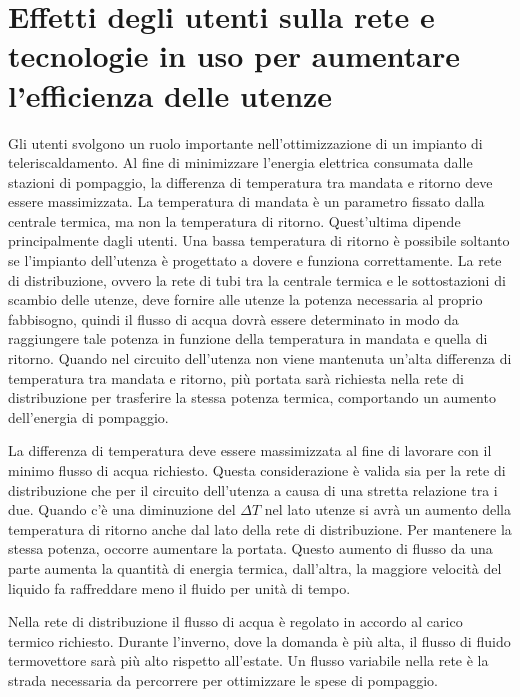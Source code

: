 \documentclass[laurea,oneside,11pt]{USiena_tesiLM}
\begin{document}
\section{Effetti degli utenti sulla rete e tecnologie in uso per aumentare l'efficienza delle utenze}
Gli utenti svolgono un ruolo importante nell'ottimizzazione di un impianto di teleriscaldamento. Al fine di minimizzare l'energia elettrica consumata dalle stazioni di pompaggio, la differenza di temperatura tra mandata e ritorno deve essere massimizzata. La temperatura di mandata è un parametro fissato dalla centrale termica, ma non la temperatura di ritorno. Quest'ultima dipende principalmente dagli utenti. Una bassa temperatura di ritorno è possibile soltanto se l'impianto dell'utenza è progettato a dovere e funziona correttamente.
La rete di distribuzione, ovvero la rete di tubi tra la centrale termica e le sottostazioni di scambio delle utenze, deve fornire alle utenze la potenza necessaria al proprio fabbisogno, quindi il flusso di acqua dovrà essere determinato in modo da raggiungere tale potenza in funzione della temperatura in mandata e quella di ritorno. Quando nel circuito dell'utenza non viene mantenuta un'alta differenza di temperatura tra mandata e ritorno, più portata sarà richiesta nella rete di distribuzione per trasferire la stessa potenza termica,
comportando un aumento dell'energia di pompaggio.

La differenza di temperatura deve essere massimizzata al fine di lavorare con il minimo flusso di acqua richiesto. Questa considerazione è valida sia per la rete di distribuzione che per il circuito dell'utenza a causa di una stretta relazione tra i due. 
Quando c'è una diminuzione del $\Delta T$ nel lato utenze si avrà un aumento della temperatura di ritorno anche dal lato della rete di distribuzione. Per mantenere la stessa potenza, occorre aumentare la portata. Questo aumento di flusso da una parte aumenta la quantità di energia termica, dall'altra, la maggiore velocità del liquido fa raffreddare meno il fluido per unità di tempo. 

Nella rete di distribuzione il flusso di acqua è regolato in accordo al carico termico richiesto. Durante l'inverno, dove la domanda è più alta, il flusso di fluido termovettore sarà più alto rispetto all'estate. Un flusso variabile nella rete è la strada necessaria da percorrere per ottimizzare le spese di pompaggio.
\end{document}
